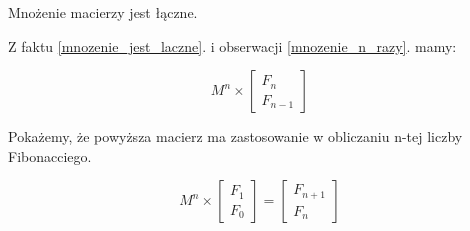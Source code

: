 \begin{fact}{Mnożenie macierzy jest łączne.}
\label{mnozenie_jest_laczne}
\end{fact}

Z faktu \ref{mnozenie_jest_laczne}. i obserwacji \ref{mnozenie_n_razy}. mamy:

\begin{equation}
	M^n \times \begin{bmatrix}F_n \\ F_{n - 1}\end{bmatrix}
\end{equation}

Pokażemy, że powyższa macierz ma zastosowanie w obliczaniu n-tej liczby Fibonacciego.

\begin{lemma}
\begin{equation}
	M^{n} \times \begin{bmatrix}F_1 \\ F_0\end{bmatrix} = \begin{bmatrix}F_{n + 1} \\ F_{n}\end{bmatrix}
\end{equation}
\end{lemma}

